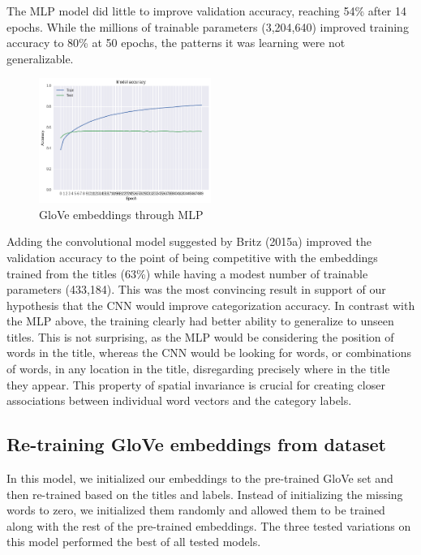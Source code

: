 \documentclass[jou,apacite, 10px]{apa6}
\begin{document}
The MLP model did little to improve validation accuracy, reaching 54\% after 14 epochs. While the millions of trainable parameters (3,204,640) improved training accuracy to 80\% at 50 epochs, the patterns it was learning were not generalizable.\\

\begin{figure}[h!]
\captionsetup{justification=centering}
    \centering
     \includegraphics[width=0.5\textwidth]{images/Training-GloveMLP}
        \caption{GloVe embeddings through MLP}
\end{figure}

Adding the convolutional model suggested by Britz (2015a) improved the validation accuracy to the point of being competitive with the embeddings trained from the titles (63\%) while having a modest number of trainable parameters (433,184). This was the most convincing result in support of our hypothesis that the CNN would improve categorization accuracy. In contrast with the MLP above, the training clearly had better ability to generalize to unseen titles. This is not surprising, as the MLP would be considering the position of words in the title, whereas the CNN would be looking for words, or combinations of words, in any location in the title, disregarding precisely where in the title they appear. This property of spatial invariance is crucial for creating closer associations between individual word vectors and the category labels.

\subsection{Re-training GloVe embeddings from dataset}
In this model, we initialized our embeddings to the pre-trained GloVe set and then re-trained based on the titles and labels. Instead of initializing the missing words to zero, we initialized them randomly and allowed them to be trained along with the rest of the pre-trained embeddings. The three tested variations on this model performed the best of all tested models.\\
\end{document}
